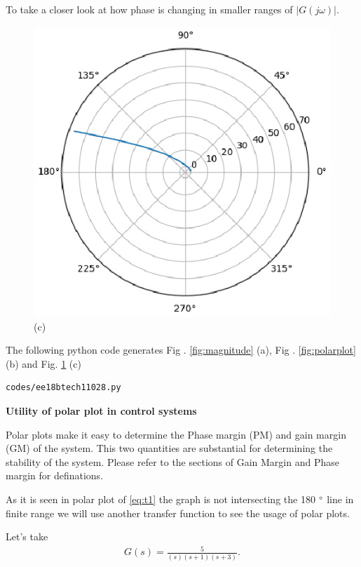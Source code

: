 \begin{enumerate}[label=\thesection.\arabic*.,ref=\thesection.\theenumi]
To take a closer look at how phase is changing in smaller ranges of $|G(j \omega)|$.
\begin{figure}[!h]
    \includegraphics[width=\columnwidth]{./figs/ee18btech11028/polar_plot2.eps}
  \caption{(c)}
  \label{fig:polarplot2}
\end{figure}

The following python code generates  Fig . \ref{fig:magnitude} (a), Fig . \ref{fig:polarplot} (b) and Fig. \ref{fig:polarplot2} (c)
\begin{lstlisting}
codes/ee18btech11028.py
\end{lstlisting}

\textbf{Utility of polar plot in control systems}

Polar plots make it easy to determine the Phase margin (PM) and gain margin (GM) of the system.
This two quantities are substantial for determining the stability of the system.
Please refer to the sections of Gain Margin and Phase margin for definations.

As it is seen in polar plot of \eqref{eq:t1} the graph is not intersecting the 180 $\degree$ line in finite range we will use another transfer function to see the usage of polar plots.

Let's take
\begin{align}
    G(s) = \frac{5}{(s)(s+1)(s+3)}.
    \label{eq:t2} 
\end{align}


\end{enumerate}
